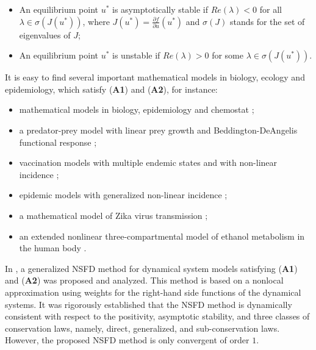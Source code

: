 \documentclass[12pt]{article}
\theoremstyle{definition}
\theoremstyle{remark}
\numberwithin{equation}{section}
\begin{document}
\begin{itemize}
\item[(i)] An equilibrium point $u^*$ is asymptotically stable if $Re(\lambda) < 0$ for all $\lambda \in \sigma(J(u^*))$, where $J(u^*) = \frac{\partial f}{\partial u}(u^*)$ and $\sigma(J)$ stands for the set of eigenvalues of $J$;
\item[(ii)] An equilibrium point $u^*$ is unstable if $Re(\lambda) > 0$ for some $\lambda \in \sigma(J(u^*))$.
\end{itemize}
It is easy to find several important mathematical models in biology, ecology and epidemiology, which satisfy (\textbf{A1}) and (\textbf{A2}), for instance:
\begin{itemize}
\item mathematical models in biology, epidemiology and chemostat \cite{Allen, Brauer, Martcheva, Smith};
\item a predator-prey model with linear prey growth and Beddington-DeAngelis functional response \cite{Dimitrov4};
\item vaccination models with multiple endemic states and  with non-linear incidence \cite{Gumel1, Kribs-Zaleta};
\item epidemic models with generalized non-linear incidence \cite{Capasso, Moghadas};
\item a mathematical model of Zika virus transmission \cite{Maamar};
\item an extended nonlinear three-compartmental model of ethanol metabolism in the human body \cite{Wacker}.
\end{itemize}
In \cite{Hoang2023}, a generalized NSFD method for dynamical system models satisfying (\textbf{A1}) and (\textbf{A2}) was proposed and analyzed. This method is based on a nonlocal approximation using weights for the right-hand side functions of the dynamical systems. It was rigorously established that the NSFD method is dynamically consistent with respect to the positivity, asymptotic stability, and three classes of conservation laws, namely, direct, generalized, and sub-conservation laws. However, the proposed NSFD method is only convergent of order $1$.
\end{document}
